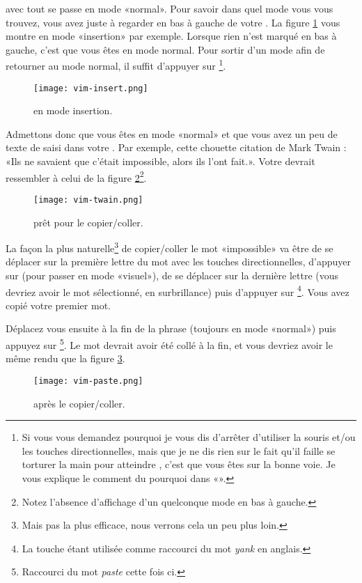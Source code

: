  avec \vim tout se passe en mode «normal». Pour savoir dans quel mode vous vous trouvez, vous avez juste à regarder en bas à gauche de votre \vim. La figure \ref{fig:insert} vous montre \vim en mode «insertion» par exemple. Lorsque rien n'est marqué en bas à gauche, c'est que vous êtes en mode normal. Pour sortir d'un mode afin de retourner au mode normal, il suffit d'appuyer sur \ttesc\footnote{Si vous vous demandez pourquoi je vous dis d'arrêter d'utiliser la souris et/ou les touches directionnelles, mais que je ne dis rien sur le fait qu'il faille se torturer la main pour atteindre \ttesc, c'est que vous êtes sur la bonne voie. Je vous explique le comment du pourquoi dans «».}.

\begin{figure}%
  \texttt{[image: vim-insert.png]}
  \caption{\vim en mode insertion.}
  \label{fig:insert}
\end{figure}

Admettons donc que vous êtes en mode «normal» et que vous avez un peu de texte de saisi dans votre \vim. Par exemple, cette chouette citation de Mark Twain : «Ils ne savaient que c'était impossible, alors ils l'ont fait.». Votre \vim devrait ressembler à celui de la figure \ref{fig:vim-twain}\footnote{Notez l'absence d'affichage d'un quelconque mode en bas à gauche.}.

\begin{figure}%
  \texttt{[image: vim-twain.png]}
  \caption{\vim prêt pour le copier/coller.}
  \label{fig:vim-twain}
\end{figure}

La façon la plus naturelle\footnote{Mais pas la plus efficace, nous verrons cela un peu plus loin.} de copier/coller le mot «impossible» va être de se déplacer sur la première lettre du mot avec les touches directionnelles, d'appuyer sur \ttv (pour passer en mode «visuel»), de se déplacer sur la dernière lettre (vous devriez avoir le mot sélectionné, en surbrillance) puis d'appuyer sur \tty\footnote{La touche \ty étant utilisée comme raccourci du mot \emph{yank} en anglais.}. Vous avez copié votre premier mot.

Déplacez vous ensuite à la fin de la phrase (toujours en mode «normal») puis appuyez sur \ttp\footnote{Raccourci du mot \emph{paste} cette fois ci.}. Le mot devrait avoir été collé à la fin, et vous devriez avoir le même rendu que la figure \ref{fig:vim-paste}.

\begin{figure}%
  \texttt{[image: vim-paste.png]}
  \caption{\vim après le copier/coller.}
  \label{fig:vim-paste}
\end{figure}

